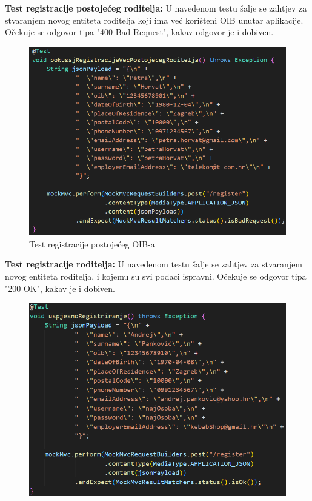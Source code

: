 			\begin{packed_enum}
				
				\item \textbf{Test registracije postojećeg roditelja:}
				\text U navedenom testu šalje se zahtjev za stvaranjem novog entiteta roditelja koji ima već korišteni OIB unutar aplikacije. Očekuje se odgovor tipa "400 Bad Request", kakav odgovor je i dobiven.
				\begin{figure}[H]
					\includegraphics[scale=0.6]{slike/isjecak1.PNG} %
					\centering
					\caption{Test registracije postojećeg OIB-a}
					\label{fig:isjecak1}
				\end{figure}
				\item \textbf{Test registracije roditelja:}
				\text U navedenom testu šalje se zahtjev za stvaranjem novog entiteta roditelja, i kojemu su svi podaci ispravni. Očekuje se odgovor tipa "200 OK", kakav je i dobiven.
				\begin{figure}[H]
					\includegraphics[scale=0.6]{slike/isjecak2.PNG} %

\end{figure}
\end{packed_enum}
